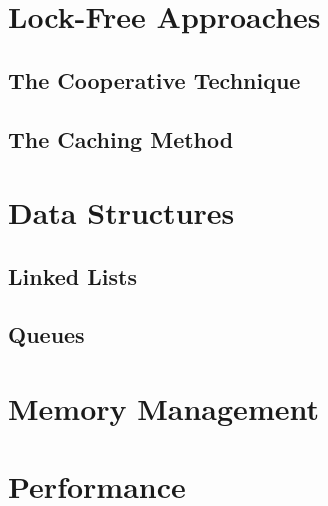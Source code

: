\section{Lock-Free Approaches}
\cite{barnes1993method}

\subsection{The Cooperative Technique}

\subsection{The Caching Method}

\newpage

\section{Data Structures}

\subsection{Linked Lists}
\cite{valois1995lock}

\subsection{Queues}
\cite{valois1994implementing}







\section{Memory Management}








\section{Performance}



